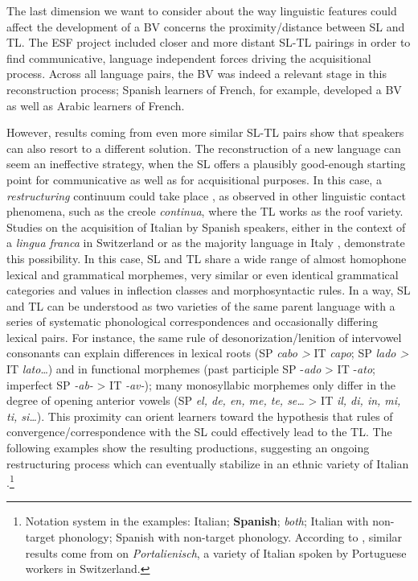 \documentclass[output=paper]{langscibook}
\begin{document}
The last dimension we want to consider about the way linguistic features could affect the development of a BV concerns the proximity/distance between SL and TL. The ESF project included closer and more distant SL-TL pairings in order to find communicative, language independent forces driving the acquisitional process. Across all language pairs, the BV was indeed a relevant stage in this reconstruction process; Spanish learners of French, for example, developed a BV as well as Arabic learners of French.

However, results coming from even more similar SL-TL pairs show that speakers can also resort to a different solution. The reconstruction of a new language can seem an ineffective strategy, when the SL offers a plausibly good-enough starting point for communicative as well as for acquisitional purposes. In this case, a \textit{restructuring} continuum could take place \citep{Corder1978}, as observed in other linguistic contact phenomena, such as the creole \textit{continua}, where the TL works as the roof variety. Studies on the acquisition of Italian by Spanish speakers, either in the context of a \textit{lingua franca} in Switzerland \citep{Schmid1994} or as the majority language in Italy \citep{Vietti2005}, demonstrate this possibility. In this case, SL and TL share a wide range of almost homophone lexical and grammatical morphemes, very similar or even identical grammatical categories and values in inflection classes and morphosyntactic rules. In a way, SL and TL can be understood as two varieties of the same parent language with a series of systematic phonological correspondences and occasionally differing lexical pairs. For instance, the same rule of desonorization\slash lenition of intervowel consonants can explain differences in lexical roots (SP \textit{cabo >} IT \textit{capo}; SP \textit{lado >} IT \textit{lato}…) and in functional morphemes (past participle SP -\textit{ado} > IT -\textit{ato}; imperfect SP \textit{{}-ab-} > IT \textit{{}-av{}-}); many monosyllabic morphemes only differ in the degree of opening anterior vowels (SP \textit{el, de, en, me, te, se…} > IT \textit{il, di, in, mi, ti, si…}). This proximity can orient learners toward the hypothesis that rules of convergence\slash correspondence with the SL could effectively lead to the TL. The following examples show the resulting productions, suggesting an ongoing restructuring process which can eventually stabilize in an ethnic variety of Italian \citep{Vietti2005}.\footnote{{Notation system in the examples: Italian;} {\textbf{Spanish}}{;} {\textit{both}}{; Italian with non-target phonology; Spanish with non-target phonology. According to \citet{Schmid1994}, similar results come from \citet{Mazzuri1990} on} {\textit{Portalienisch}}{, a variety of Italian spoken by Portuguese workers in Switzerland.}}\largerpage
\end{document}
